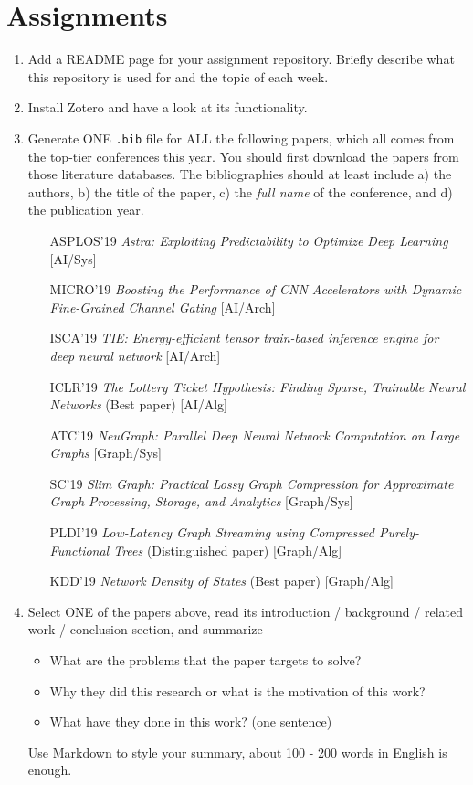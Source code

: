 \documentclass[english]{../TexTemplate/thesis}
\begin{document}
\section{Assignments}
\begin{enumerate}
\item Add a README page for your assignment repository. Briefly describe what this repository is used for and the topic of each week.
\item Install Zotero and have a look at its functionality.
\item Generate ONE \verb'.bib' file for ALL the following papers, which all comes from the top-tier conferences this year. You should first download the papers from those literature databases.
The bibliographies should at least include a) the authors, b) the title of the paper, c) the \emph{full name} of the conference, and d) the publication year.
\begin{itemize}[parsep=0.4\parskip]
	\item [ASPLOS'19] \emph{Astra: Exploiting Predictability to Optimize Deep Learning} [AI/Sys] %
	\item [MICRO'19] \emph{Boosting the Performance of CNN Accelerators with Dynamic Fine-Grained Channel Gating} [AI/Arch] %
	\item [ISCA'19] \emph{TIE: Energy-efficient tensor train-based inference engine for deep neural network} [AI/Arch] %
	\item [ICLR'19] \emph{The Lottery Ticket Hypothesis: Finding Sparse, Trainable Neural Networks} (Best paper) [AI/Alg]
	\item [ATC'19] \emph{NeuGraph: Parallel Deep Neural Network Computation on Large Graphs} [Graph/Sys] %
	\item [SC'19] \emph{Slim Graph: Practical Lossy Graph Compression for Approximate Graph Processing, Storage, and Analytics} [Graph/Sys]
	\item [PLDI'19] \emph{Low-Latency Graph Streaming using Compressed Purely-Functional Trees} (Distinguished paper) [Graph/Alg] %
	\item [KDD'19] \emph{Network Density of States} (Best paper) [Graph/Alg]
\end{itemize}
\item Select ONE of the papers above, read its introduction / background / related work / conclusion section, and summarize
\begin{itemize}
\item What are the problems that the paper targets to solve?
\item Why they did this research or what is the motivation of this work?
\item What have they done in this work? (one sentence)
\end{itemize}
Use Markdown to style your summary, about 100 - 200 words in English is enough.


\end{enumerate}
\end{document}
